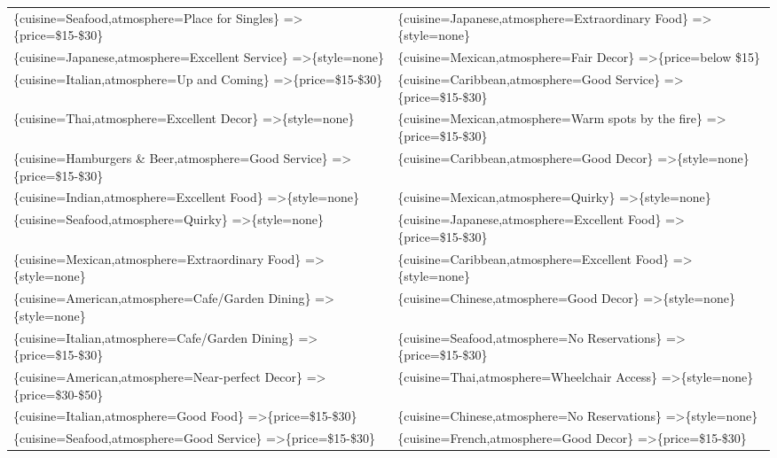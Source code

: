 \documentclass[letterpaper,10pt]{article}
\begin{document}
\begin{appendices}
\begin{table}[h]
\begin{adjustbox}{max width=\textwidth}
\begin{tabular}{ll}
\{cuisine=Seafood,atmosphere=Place for Singles\} =\textgreater \{price=\$15-\$30\} & \{cuisine=Japanese,atmosphere=Extraordinary Food\} =\textgreater \{style=none\} \\
\{cuisine=Japanese,atmosphere=Excellent Service\} =\textgreater \{style=none\} & \{cuisine=Mexican,atmosphere=Fair Decor\} =\textgreater \{price=below \$15\} \\
\{cuisine=Italian,atmosphere=Up and Coming\} =\textgreater \{price=\$15-\$30\} & \{cuisine=Caribbean,atmosphere=Good Service\} =\textgreater \{price=\$15-\$30\} \\
\{cuisine=Thai,atmosphere=Excellent Decor\} =\textgreater \{style=none\} & \{cuisine=Mexican,atmosphere=Warm spots by the fire\} =\textgreater \{price=\$15-\$30\} \\
\{cuisine=Hamburgers \& Beer,atmosphere=Good Service\} =\textgreater \{price=\$15-\$30\} & \{cuisine=Caribbean,atmosphere=Good Decor\} =\textgreater \{style=none\} \\
\{cuisine=Indian,atmosphere=Excellent Food\} =\textgreater \{style=none\} & \{cuisine=Mexican,atmosphere=Quirky\} =\textgreater \{style=none\} \\
\{cuisine=Seafood,atmosphere=Quirky\} =\textgreater \{style=none\} & \{cuisine=Japanese,atmosphere=Excellent Food\} =\textgreater \{price=\$15-\$30\} \\
\{cuisine=Mexican,atmosphere=Extraordinary Food\} =\textgreater \{style=none\} & \{cuisine=Caribbean,atmosphere=Excellent Food\} =\textgreater \{style=none\} \\
\{cuisine=American,atmosphere=Cafe/Garden Dining\} =\textgreater \{style=none\} & \{cuisine=Chinese,atmosphere=Good Decor\} =\textgreater \{style=none\} \\
\{cuisine=Italian,atmosphere=Cafe/Garden Dining\} =\textgreater \{price=\$15-\$30\} & \{cuisine=Seafood,atmosphere=No Reservations\} =\textgreater \{price=\$15-\$30\} \\
\{cuisine=American,atmosphere=Near-perfect Decor\} =\textgreater \{price=\$30-\$50\} & \{cuisine=Thai,atmosphere=Wheelchair Access\} =\textgreater \{style=none\} \\
\{cuisine=Italian,atmosphere=Good Food\} =\textgreater \{price=\$15-\$30\} & \{cuisine=Chinese,atmosphere=No Reservations\} =\textgreater \{style=none\} \\
\{cuisine=Seafood,atmosphere=Good Service\} =\textgreater \{price=\$15-\$30\} & \{cuisine=French,atmosphere=Good Decor\} =\textgreater \{price=\$15-\$30\} \\

\end{tabular}
\end{adjustbox}
\end{table}
\end{appendices}
\end{document}
